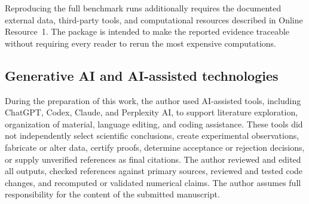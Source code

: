 Reproducing the full benchmark runs additionally requires the documented external data, third-party tools, and computational resources described in Online Resource~1. The package is intended to make the reported evidence traceable without requiring every reader to rerun the most expensive computations.

\subsection*{Generative AI and AI-assisted technologies}
During the preparation of this work, the author used AI-assisted tools, including ChatGPT, Codex, Claude, and Perplexity AI, to support literature exploration, organization of material, language editing, and coding assistance. These tools did not independently select scientific conclusions, create experimental observations, fabricate or alter data, certify proofs, determine acceptance or rejection decisions, or supply unverified references as final citations. The author reviewed and edited all outputs, checked references against primary sources, reviewed and tested code changes, and recomputed or validated numerical claims. The author assumes full responsibility for the content of the submitted manuscript.
